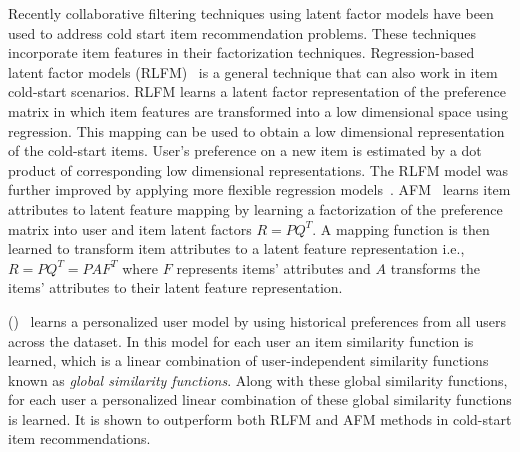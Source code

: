 Recently collaborative filtering techniques using latent
factor models have been used to address cold start item recommendation
problems. These techniques incorporate item features in their factorization
techniques. Regression-based latent factor models (RLFM)~\cite{agarwal09} is a
general technique that can also work in item cold-start scenarios. 
RLFM learns a latent factor representation of the preference matrix
in which item features are transformed into a low dimensional space using regression.
This mapping can be used to obtain a low dimensional representation of the cold-start
items. User's preference on a new item is estimated by a dot product of
corresponding low dimensional representations. The RLFM model was further
improved by applying more flexible regression models~\cite{zhangrecsys11}.
AFM~\cite{gantner10} learns item attributes to latent feature mapping
by learning a factorization of the preference matrix
into user and item latent factors $R = PQ^T$. A mapping function is then learned
to transform item attributes to a latent feature representation i.e., $R = PQ^T =
PAF^T$ where $F$ represents items' attributes and $A$ transforms the items' attributes 
to their latent feature representation. 


\CFLINEXP (\CFLIN)~\cite{elbadrawy2015} learns a personalized user
model by using historical preferences from all users across the dataset. In
this model for each user an item similarity function is learned, which is a
linear combination of user-independent similarity functions known as
\textit{global similarity functions}. Along with these global similarity
functions, for each user a personalized linear combination of these global
similarity functions is learned. It is shown to outperform both RLFM and AFM
methods in cold-start \TOPN item recommendations.


